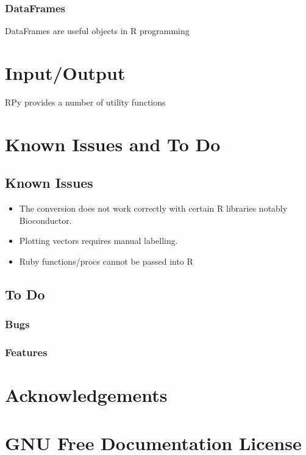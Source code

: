 \documentclass[a4paper,12pt]{book}
\begin{document}
\subsection{DataFrames}

DataFrames are useful objects in R programming

\chapter{Input/Output}

RPy provides a number of utility functions 

\chapter{Known Issues and To Do}

\section{Known Issues}

\begin{itemize}
\item The conversion does not work correctly with certain R libraries notably Bioconductor.
\item Plotting vectors requires manual labelling.
\item Ruby functions/procs cannot be passed into R
\end{itemize}

\section{To Do}

\subsection{Bugs}
\subsection{Features}

\chapter{Acknowledgements}

\chapter{GNU Free Documentation License}
\end{document}
